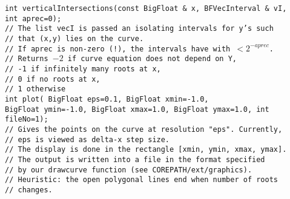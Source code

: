 \begin{progb}{
\> \tt   int verticalIntersections(const BigFloat \& x, BFVecInterval \& vI,\\
\>\> \> 			  int aprec=0);\\
\> \>  // The list vecI is passed an isolating intervals for y's such \\
\> \>  // that (x,y) lies on the curve.\\
\> \>  // If aprec is non-zero (!), the intervals have with $<2^{-aprec}$.\\
\> \>  // Returns $-2$ if curve equation does not depend on Y,\\
\> \>  //       -1 if infinitely many roots at x,\\
\> \>  //    	0 if no roots at x,\\
\> \>  //    	1 otherwise\\
\> \tt  int  plot( BigFloat eps=0.1, BigFloat xmin=-1.0,\\
\> \> \>     BigFloat ymin=-1.0, BigFloat xmax=1.0, BigFloat ymax=1.0, int fileNo=1);\\
\> \>  //    Gives the points on the curve at resolution "eps".  Currently,\\
\> \>   //    eps is viewed as delta-x step size.\\
\> \>   //    The display is done in the rectangle [xmin, ymin, xmax, ymax].\\
\> \>   //    The output is written into a file in the format specified\\
\> \>   //    by our drawcurve function (see COREPATH/ext/graphics).\\
\> \>   //    Heuristic: the open polygonal lines end when number of roots\\
\> \>   //    changes.
}\end{progb}

